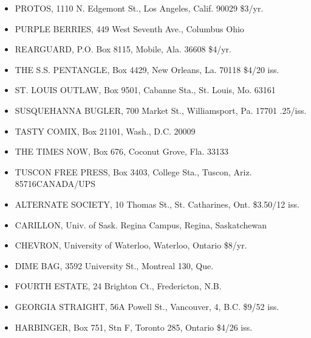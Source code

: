 \documentclass[11pt,twoside,a4paper]{book}
\begin{document}
\begin{minipage}[t]{0.20\textwidth}
\begin{scriptsize}
\begin{itemize}
	\item[] PROTOS, 1110 N. Edgemont St., Los 	Angeles, Calif. 90029 \$3/yr. 
	\item[] PURPLE BERRIES, 449 West Seventh Ave., Columbus Ohio 
	\item[] REARGUARD, P.O. Box 8115, Mobile, Ala. 36608 \$4/yr. 
	\item[] THE S.S. PENTANGLE, Box 4429, New Orleans, La. 70118 \$4/20 iss. 
	\item[] ST. LOUIS OUTLAW, Box 9501, Cabanne Sta., St. Louis, Mo. 63161 
	\item[] SUSQUEHANNA BUGLER, 700 Market St., Williamsport, Pa. 17701	.25/iss.
	\item[] TASTY COMIX, Box 21101, Wash., D.C. 20009 
	\item[] THE TIMES NOW, Box 676, Coconut Grove, Fla. 33133 
	\item[] TUSCON FREE PRESS, Box 3403, College Sta., Tuscon, Ariz. 85716CANADA/UPS 
	\item[] ALTERNATE SOCIETY, 10 Thomas St., St. Catharines, Ont.	\$3.50/12 iss. 
	\item[] CARILLON, Univ. of Sask. Regina Campus, Regina, Saskatchewan 
	\item[] CHEVRON, University of Waterloo, Waterloo, Ontario \$8/yr. 
	\item[] DIME BAG, 3592 University St., Montreal 130, Que. 
	\item[] FOURTH ESTATE, 24 Brighton Ct., Fredericton, N.B. 
	\item[] GEORGIA STRAIGHT, 56A Powell St., Vancouver, 4, B.C. \$9/52 iss. 
	\item[] HARBINGER, Box 751, Stn F, Toronto 285, Ontario \$4/26 iss. 
\end{itemize}
\end{scriptsize}
\end{minipage}\hfill
\end{document}
